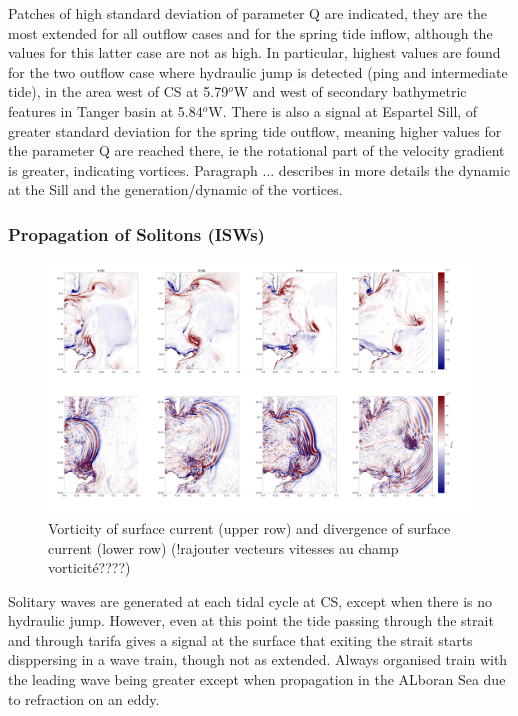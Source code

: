 Patches of high standard deviation of parameter Q are indicated, they are the most extended for all outflow cases and for the spring tide inflow, although the values for this latter case are not as high. In particular, highest values are found for the two outflow case where hydraulic jump is detected (ping and intermediate tide), in the area west of CS at 5.79$^o$W and west of secondary bathymetric features in Tanger basin at 5.84$^o$W. There is also a signal at Espartel Sill, of greater standard deviation for the spring tide outflow, meaning higher values for the parameter Q are reached there, ie the rotational part of the velocity gradient is greater, indicating vortices. Paragraph ... describes in more details the dynamic at the Sill and the generation/dynamic of the vortices. 





\subsubsection{Propagation of Solitons (ISWs)}

\begin{figure}[!h]
 \centering
\includegraphics[width=\linewidth]{./GBR3D/FigTourbVE2.png}
 \caption {Vorticity of surface current (upper row) and divergence of surface current (lower row)  (!rajouter vecteurs vitesses au champ vorticité????)}
 \label{FigeddGBR3D}
\end{figure}

Solitary waves are generated at each tidal cycle at CS, except when there is no hydraulic jump. However, even at this point the tide passing through the strait and through tarifa gives a signal at the surface that exiting the strait starts disppersing in a wave train, though not as extended. Always organised train with the leading wave being greater except when propagation in the ALboran Sea due to refraction on an eddy.

